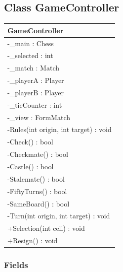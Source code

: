 \documentclass[12pt]{article}
\begin{document}
\subsection{Class GameController}

\begin{table}[H]
    \begin{tabular}{|l|}
    \hline
    \rowcolor[HTML]{C0C0C0} 
    \textbf{GameController}              \\ \hline
    \rowcolor[HTML]{EFEFEF} 
    -\_main : Chess                      \\ \hline
    \rowcolor[HTML]{EFEFEF} 
    -\_selected : int                    \\ \hline
    \rowcolor[HTML]{EFEFEF} 
    -\_match : Match                     \\ \hline
    \rowcolor[HTML]{EFEFEF} 
    -\_playerA : Player                  \\ \hline
    \rowcolor[HTML]{EFEFEF} 
    -\_playerB : Player                  \\ \hline
    \rowcolor[HTML]{EFEFEF} 
    -\_tieCounter : int                  \\ \hline
    \rowcolor[HTML]{EFEFEF} 
    -\_view : FormMatch                  \\ \hline
    -Rules(int origin, int target) : void\\ \hline
    -Check() : bool                      \\ \hline
    -Checkmate() : bool                  \\ \hline
    -Castle() : bool                     \\ \hline
    -Stalemate() : bool                  \\ \hline
    -FiftyTurns() : bool                 \\ \hline
    -SameBoard() : bool                  \\ \hline
    -Turn(int origin, int target) : void \\ \hline
    +Selection(int cell) : void          \\ \hline
    +Resign() : void                     \\ \hline
    \end{tabular}
\end{table}

\subsubsection{Fields}
\end{document}
